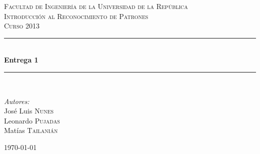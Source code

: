 \documentclass[12pt,a4paper,titlepage]{report}
\newcommand{\HRule}{\rule{\linewidth}{0.5mm}}
\begin{document}
\begin{titlepage}
\begin{center}
\vspace{2cm}
\textsc{\LARGE Facultad de Ingenier\'ia de la Universidad de la Rep\'ublica}\\[1.5cm]
\vspace{2cm}
\textsc{\Large Introducción al Reconocimiento de Patrones  \\[1cm]  Curso 2013}\\[0.5cm]
\vspace{2cm}
\HRule \\[0.4cm]
{ \huge \bfseries Entrega 1}\\[0.4cm]
\HRule \\[1.5cm]
\vspace{2cm}
\begin{minipage}{0.4\textwidth}
\begin{flushleft} \large
\emph{Autores:}\\
José Luis \textsc{Nunes}\\
Leonardo \textsc{Pujadas} \\
Mat\'ias \textsc{Tailani\'an}
\end{flushleft}
\end{minipage}
\begin{minipage}{0.4\textwidth}
\begin{flushright} \large
\end{flushright}
\end{minipage}

\vspace{3cm}

\vfill
\begin{figure} [h!]
\centering
{}\hspace{1cm}
\hspace{1cm}
\end{figure}

{\large \today}
\end{center}
\end{titlepage}
\end{document}
